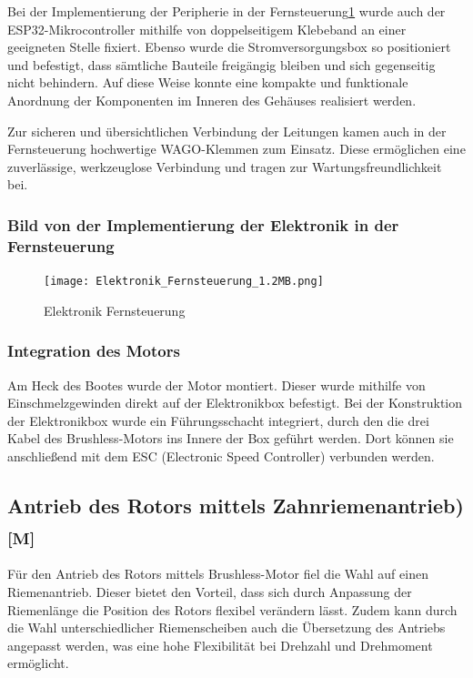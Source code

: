 \documentclass[a4paper,12pt]{article}
\begin{document}
Bei der Implementierung der Peripherie in der Fernsteuerung\ref{fig:Elektronik Fernsteuerung} wurde auch der ESP32-Mikrocontroller mithilfe von doppelseitigem Klebeband an einer geeigneten Stelle fixiert. Ebenso wurde die Stromversorgungsbox so positioniert und befestigt, dass sämtliche Bauteile freigängig bleiben und sich gegenseitig nicht behindern. Auf diese Weise konnte eine kompakte und funktionale Anordnung der Komponenten im Inneren des Gehäuses realisiert werden.

Zur sicheren und übersichtlichen Verbindung der Leitungen kamen auch in der Fernsteuerung hochwertige WAGO-Klemmen zum Einsatz. Diese ermöglichen eine zuverlässige, werkzeuglose Verbindung und tragen zur Wartungsfreundlichkeit bei.

\subsubsection{Bild von der Implementierung der Elektronik in der Fernsteuerung}

\begin{figure}[H]
    \centering
    \texttt{[image: Elektronik\_Fernsteuerung\_1.2MB.png]}
    \caption{Elektronik Fernsteuerung}
    \label{fig:Elektronik Fernsteuerung}
\end{figure}



\subsubsection{Integration des Motors}

Am Heck des Bootes wurde der Motor montiert. Dieser wurde mithilfe von Einschmelzgewinden direkt auf der Elektronikbox befestigt. Bei der Konstruktion der Elektronikbox wurde ein Führungsschacht integriert, durch den die drei Kabel des Brushless-Motors ins Innere der Box geführt werden. Dort können sie anschließend mit dem ESC (Electronic Speed Controller) verbunden werden.



\subsection{\texorpdfstring{Antrieb des Rotors mittels Zahnriemenantrieb) \textsubscript{[M]}}{Antrieb des Rotors mittels Zahnriemenantrieb) [M]}}

Für den Antrieb des Rotors mittels Brushless-Motor fiel die Wahl auf einen Riemenantrieb. Dieser bietet den Vorteil, dass sich durch Anpassung der Riemenlänge die Position des Rotors flexibel verändern lässt. Zudem kann durch die Wahl unterschiedlicher Riemenscheiben auch die Übersetzung des Antriebs angepasst werden, was eine hohe Flexibilität bei Drehzahl und Drehmoment ermöglicht.
\end{document}
